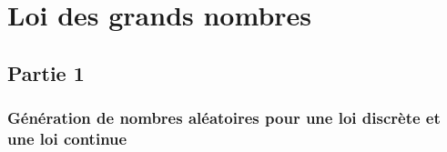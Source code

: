 \chapter{Loi des grands nombres}

\section{Partie 1}

\subsection{Génération de nombres aléatoires pour une loi discrète et une loi continue}